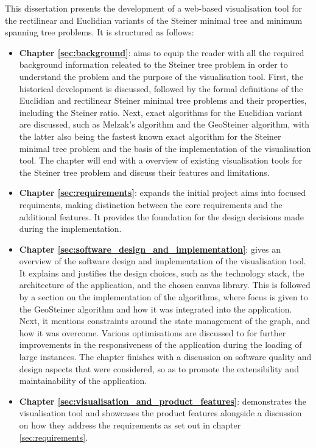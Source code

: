 \documentclass{l4proj}
\begin{document}
This dissertation presents the development of a web-based visualisation tool for the rectilinear and Euclidian variants of the Steiner minimal tree and minimum spanning tree problems. It is structured as follows:
\begin{itemize}
    \item \textbf{Chapter \ref{sec:background}}: aims to equip the reader with all the required background information releated to the Steiner tree problem in order to understand the problem and the purpose of the visualisation tool. First, the historical development is discussed, followed by the formal definitions of the Euclidian and rectilinear Steiner minimal tree problems and their properties, including the Steiner ratio. Next, exact algorithms for the Euclidian variant are discussed, such as Melzak's algorithm and the GeoSteiner algorithm, with the latter also being the fastest known exact algorithm for the Steiner minimal tree problem and the basis of the implementation of the visualisation tool. The chapter will end with a overview of existing visualisation tools for the Steiner tree problem and discuss their features and limitations.
    \item \textbf{Chapter \ref{sec:requirements}}: expands the initial project aims into focused requiments, making distinction between the core requirements and the additional features. It provides the foundation for the design decisions made during the implementation.
    \item \textbf{Chapter \ref{sec:software_design_and_implementation}}: gives an overview of the software design and implementation of the visualisation tool. It explains and justifies the design choices, such as the technology stack, the architecture of the application, and the chosen canvas library. This is followed by a section on the implementation of the algorithms, where focus is given to the GeoSteiner algorithm and how it was integrated into the application. Next, it mentions constraints around the state management of the graph, and how it was overcome. Various optimisations are discussed to for further improvements in the responsiveness of the application during the loading of large instances. The chapter finishes with a discussion on software quality and design aspects that were considered, so as to promote the extensibility and maintainability of the application.
    \item \textbf{Chapter \ref{sec:visualisation_and_product_features}}: demonstrates the visualisation tool and showcases the product features alongside a discussion on how they address the requirements as set out in chapter \ref{sec:requirements}.

\end{itemize}
\end{document}
